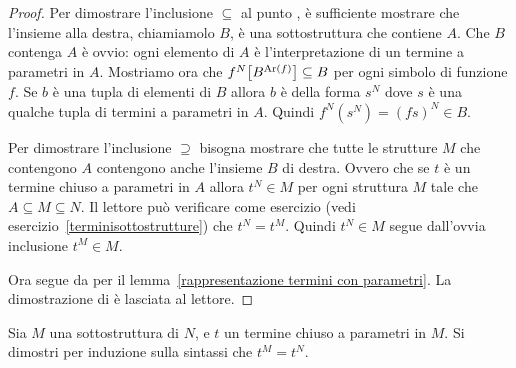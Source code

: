 \begin{proof}  %

Per dimostrare l'inclusione $\subseteq$ al punto , \`e sufficiente mostrare che l'insieme alla destra, chiamiamolo $B$, \`e una sottostruttura che contiene $A$. Che $B$ contenga $A$ \`e ovvio: ogni elemento di $A$ \`e l'interpretazione di un termine a parametri in $A$. Mostriamo ora che $f^N\big[B^{{\rm Ar}(f)}\big]\subseteq B$ per ogni simbolo di funzione $f$. Se $b$ \`e una tupla di elementi di $B$ allora $b$ \`e della forma $s^N$ dove $s$ \`e una qualche tupla di termini a parametri in $A$. Quindi $f^N(s^N)=(fs)^N\in B$.

Per dimostrare l'inclusione $\supseteq$ bisogna mostrare che tutte le strutture $M$ che contengono $A$ contengono anche l'insieme $B$ di destra. Ovvero che se $t$ \`e un termine chiuso a parametri in $A$ allora $t^N\in M$ per ogni struttura $M$ tale che $A\subseteq M\subseteq N$. Il lettore pu\`o verificare come esercizio (vedi esercizio~\ref{terminisottostrutture}) che $t^N=t^M$. Quindi $t^N\in M$ segue dall'ovvia inclusione $t^M\in M$.

Ora  segue da  per il lemma~\ref{rappresentazione termini con parametri}. La dimostrazione di  \`e lasciata al lettore.
\end{proof}

% 

\begin{exercise}\label{terminisottostrutture}
Sia $M$ una sottostruttura di $N$, e $t$ un termine chiuso a parametri in $M$. Si dimostri per induzione sulla sintassi che $t^M=t^N$.
\end{exercise}